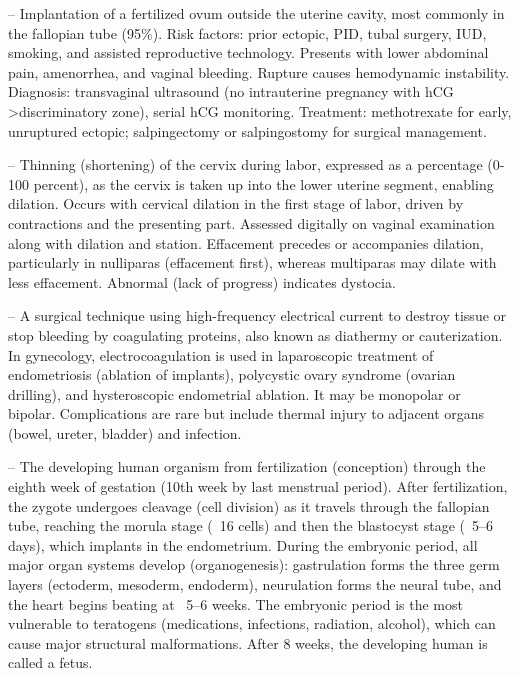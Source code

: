 -- Implantation of a fertilized ovum outside the uterine cavity, most commonly in the fallopian tube (95\%). Risk factors: prior ectopic, PID, tubal surgery, IUD, smoking, and assisted reproductive technology. Presents with lower abdominal pain, amenorrhea, and vaginal bleeding. Rupture causes hemodynamic instability. Diagnosis: transvaginal ultrasound (no intrauterine pregnancy with hCG >discriminatory zone), serial hCG monitoring. Treatment: methotrexate for early, unruptured ectopic; salpingectomy or salpingostomy for surgical management.

-- Thinning (shortening) of the cervix during labor, expressed as a percentage (0-100 percent), as the cervix is taken up into the lower uterine segment, enabling dilation. Occurs with cervical dilation in the first stage of labor, driven by contractions and the presenting part. Assessed digitally on vaginal examination along with dilation and station. Effacement precedes or accompanies dilation, particularly in nulliparas (effacement first), whereas multiparas may dilate with less effacement. Abnormal (lack of progress) indicates dystocia.

-- A surgical technique using high-frequency electrical current to destroy tissue or stop bleeding by coagulating proteins, also known as diathermy or cauterization. In gynecology, electrocoagulation is used in laparoscopic treatment of endometriosis (ablation of implants), polycystic ovary syndrome (ovarian drilling), and hysteroscopic endometrial ablation. It may be monopolar or bipolar. Complications are rare but include thermal injury to adjacent organs (bowel, ureter, bladder) and infection.

-- The developing human organism from fertilization (conception) through the eighth week of gestation (10th week by last menstrual period). After fertilization, the zygote undergoes cleavage (cell division) as it travels through the fallopian tube, reaching the morula stage (~16 cells) and then the blastocyst stage (~5--6 days), which implants in the endometrium. During the embryonic period, all major organ systems develop (organogenesis): gastrulation forms the three germ layers (ectoderm, mesoderm, endoderm), neurulation forms the neural tube, and the heart begins beating at ~5--6 weeks. The embryonic period is the most vulnerable to teratogens (medications, infections, radiation, alcohol), which can cause major structural malformations. After 8 weeks, the developing human is called a fetus.

